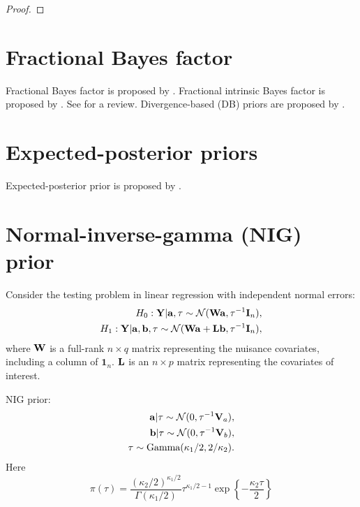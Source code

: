\documentclass[11pt]{article}
\newcommand{\Ba}{\mathbf{a}}    \newcommand{\Bb}{\mathbf{b}}    \newcommand{\Bc}{\mathbf{c}}    \newcommand{\Bd}{\mathbf{d}}    \newcommand{\Be}{\mathbf{e}}    \newcommand{\Bf}{\mathbf{f}}    \newcommand{\Bg}{\mathbf{g}}    \newcommand{\Bh}{\mathbf{h}}    \newcommand{\Bi}{\mathbf{i}}    \newcommand{\Bj}{\mathbf{j}}    \newcommand{\Bk}{\mathbf{k}}    \newcommand{\Bl}{\mathbf{l}}
\newcommand{\BY}{\mathbf{Y}}    \newcommand{\BZ}{\mathbf{Z}}
\theoremstyle{plain}
\theoremstyle{definition}
\theoremstyle{remark}
\begin{document}
\begin{proof}
\end{proof}



\section{Fractional Bayes factor}
Fractional Bayes factor is proposed by \cite{Fractional1995}.
Fractional intrinsic Bayes factor is proposed by \cite{santis1997Alt}.
See \cite{Santis1999} for a review.
Divergence-based (DB) priors are proposed by \cite{Bayarri2008Gen}.








\section{Expected-posterior priors}
Expected-posterior prior is proposed by \cite{Perez2002}.
\section{Normal-inverse-gamma (NIG) prior}
\cite{zhou2018On}

Consider the testing problem in linear regression with independent normal errors:
\begin{equation*}
    \begin{split}
    H_0:
    \BY|\Ba,\tau \sim \mathcal N (\BW \Ba,\tau^{-1}\BI_n),
    \\
    H_1:
    \BY|\Ba,\Bb, \tau \sim \mathcal N (\BW \Ba + \BL \Bb, \tau^{-1} \BI_n),
    \end{split}
\end{equation*}
where $\mathbf{W}$ is a full-rank $n\times q$ matrix representing the nuisance covariates, including a column of $\mathbf 1_n$.
$\mathbf{L}$ is an $n\times p$ matrix representing the covariates of interest.

NIG prior:
\begin{equation*}
    \begin{split}
        \Ba | \tau \sim \mathcal N (0, \tau^{-1} \BV_a),
        \\
        \Bb | \tau \sim \mathcal N (0, \tau^{-1} \BV_b),
        \\
        \tau \sim \text{Gamma} (\kappa_1/2,2/\kappa_2)
        .
    \end{split}
\end{equation*}
Here
\begin{equation*}
        \pi(\tau) =\frac{(\kappa_2/2)^{\kappa_1/2}}{\Gamma (\kappa_1/2)}
        \tau^{\kappa_1/2-1} \exp\left\{-\frac{\kappa_2 \tau}{2}\right\}
\end{equation*}
\end{document}
